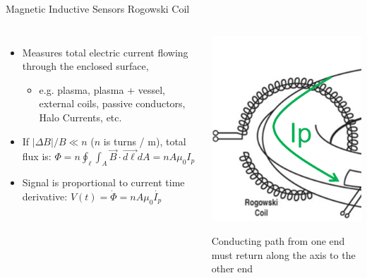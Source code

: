 \documentclass{beamer}
\begin{document}
\begin{frame}{Magnetic Inductive Sensors } {Rogowski Coil}

\begin{columns}
  \begin{itemize}
  \item Measures \alert{ total electric current} flowing through the enclosed surface,
	\begin{itemize}
	\item
		e.g. plasma, plasma + vessel, external coils, passive conductors, Halo Currents, etc.
	\end{itemize}
  \item   If $|\Delta B|/B \ll n $ ($n$ is turns / m),  total flux  is:
$\Phi = n \oint_\ell \int_A  \vec{B}\cdot  \vec{d \ell} d A = n A \mu_0 I_p$
\item Signal is proportional to current time derivative: $ V(t)= \dot{\Phi} =  n A \mu_0 \dot{I_p}$
	\end{itemize}
	\begin{center}
	\includegraphics[width=.7\columnwidth]{rogow.png}
	 \begin{block}{}
		\small Conducting path from one end must return along the axis to the other end
	\end{block}
	\end{center}

\end{columns}
\end{frame}
\end{document}
